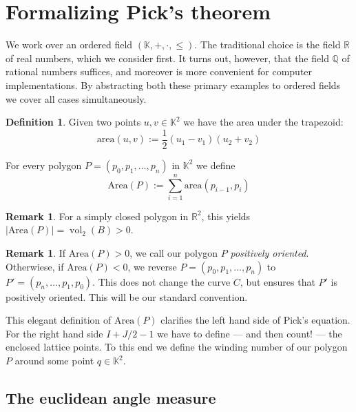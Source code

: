 \documentclass[a4paper]{amsart}
\numberwithin{equation}{section}
\theoremstyle{plain}
\theoremstyle{definition}
\newtheorem{definition}[theorem]{Definition}
\newtheorem{remark}[theorem]{Remark}
\newcommand{\Q}{\mathbb{Q}}
\newcommand{\R}{\mathbb{R}}
\newcommand{\K}{\mathbb{K}}
\newcommand{\abs}[1]{\lvert #1 \rvert}
\DeclareMathOperator{\vol}{vol}
\newcommand{\area}{\mathrm{area}}
\newcommand{\Area}{\mathrm{Area}}
\begin{document}
\section{Formalizing Pick's theorem}

We work over an ordered field $(\K,+,\cdot,\le)$.
The traditional choice is the field $\R$
of real numbers, which we consider first.
It turns out, however, that the field $\Q$ of rational numbers suffices,
and moreover is more convenient for computer implementations.
By abstracting both these primary examples
to ordered fields we cover all cases simultaneously.

\begin{definition}
  Given two points $u,v \in \K^2$ we have the area under the trapezoid:
  \[
  \area(u,v) := \frac{1}{2} (u_1 - v_1) (u_2 + v_2)
  \]
  
  For every polygon $P = (p_0,p_1,\ldots,p_n)$ in $\K^2$ we define
  \[
  \Area(P) := \sum_{i=1}^{n} \area(p_{i-1},p_i)
  \]
\end{definition}

\begin{remark}
  For a simply closed polygon in $\R^2$, this yields $\abs{\Area(P)} = \vol_2(B) > 0$.
\end{remark}

\begin{remark}
  If $\Area(P) > 0$, we call our polygon $P$ \emph{positively oriented}.
  Otherwiese, if $\Area(P) < 0$, we reverse $P = (p_0,p_1,\ldots,p_n)$
  to $P' = (p_n,\ldots,p_1,p_0)$.  This does not change the curve $C$,
  but ensures that $P'$ is positively oriented.
  This will be our standard convention.
\end{remark}

This elegant definition of $\Area(P)$ clarifies
the left hand side of Pick's equation.
For the right hand side $I + J/2 - 1$
we have to define --- and then count! ---
the enclosed lattice points.
To this end we define the winding number
of our polygon $P$ around some point $q \in \K^2$.


\subsection{The euclidean angle measure}
\end{document}
